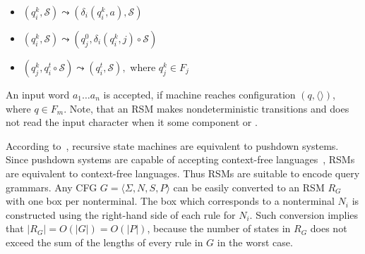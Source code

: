 \begin{itemize}
    \item $(q_i^k,\mathcal{S}) \leadsto (\delta_i (q_i^k, a),\mathcal{S})$
    \item $(q_i^k,\mathcal{S}) \leadsto (q_j^0, \delta_i (q_i^k, j) \circ\mathcal{S})$
    \item $(q_j^k,q_i^t\circ \mathcal{S}) \leadsto (q_i^t, \mathcal{S}),$ where $q_j^k \in F_j$
\end{itemize}

An input word $a_1 \dots a_n$ is accepted, if machine reaches configuration $(q,\langle\rangle)$, where $q \in F_m$.
Note, that an RSM makes nondeterministic transitions and does not read the input character when it  some component or .

According to~\cite{rsm:analysis:10.1007/3-540-44585-4_18}, recursive state machines are equivalent to pushdown systems.
Since pushdown systems are capable of accepting context-free languages~\citep{automata:theory:10.5555/1177300}, RSMs are equivalent to context-free languages.
Thus RSMs are suitable to encode query grammars.
Any CFG $G=\langle\Sigma, N, S, P\rangle$ can be easily converted to an RSM $R_G$ with one box per nonterminal.
The box which corresponds to a nonterminal $N_i$ is constructed using the right-hand side of each rule for $N_i$.
Such conversion implies that $|R_G| = O(|G|) = O(|P|)$, because the number of states in $R_G$ does not exceed the sum of the lengths of every rule in $G$ in the worst case.

